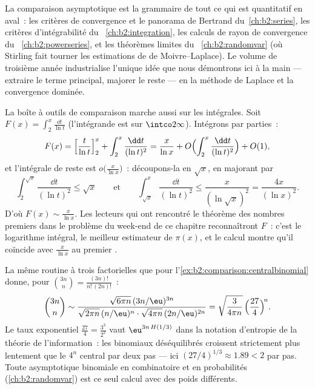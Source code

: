 \begin{remark}
La comparaison asymptotique est la grammaire de tout ce qui est
quantitatif en aval~: les critères de convergence et le panorama de
Bertrand du~\cref{ch:b2:series}, les critères d'intégrabilité du~%
\cref{ch:b2:integration}, les calculs de rayon de convergence du~%
\cref{ch:b2:powerseries}, et les théorèmes limites du~%
\cref{ch:b2:randomvar} (où Stirling fait tourner les estimations de de
Moivre--Laplace). Le volume de troisième année industrialise l'unique
idée que nous démontrons ici à la main --- extraire le terme
principal, majorer le reste --- en la méthode de Laplace et la
convergence dominée.
\end{remark}

\begin{example}\label{ex:b2:comparison:liworked}
La boîte à outils de comparaison marche aussi sur les intégrales. Soit
$F(x) = \int_2^x\frac{\dd t}{\ln t}$ (l'intégrande est  sur
$\intco2\infty$). Intégrons par parties~:
\[
F(x) = \Bigl[\frac{t}{\ln t}\Bigr]_2^x +
\int_2^x\frac{\dd t}{(\ln t)^2}
= \frac{x}{\ln x} + O\Bigl(\int_2^x\frac{\dd t}{(\ln
t)^2}\Bigr) + O(1),
\]
et l'intégrale de reste est $o\bigl(\frac{x}{\ln x}\bigr)$~:
découpons-la en $\sqrt x$, en majorant par
\[
\int_2^{\sqrt x}\frac{\dd t}{(\ln t)^2} \leq \sqrt x
\qquad\text{et}\qquad
\int_{\sqrt x}^{x}\frac{\dd t}{(\ln t)^2} \leq
\frac{x}{(\ln\sqrt x)^2} = \frac{4x}{(\ln x)^2} .
\]
D'où $F(x) \sim \frac{x}{\ln x}$. Les lecteurs qui ont rencontré le
théorème des nombres premiers dans le problème du week-end de ce
chapitre reconnaîtront $F$~: c'est le logarithme intégral, le meilleur
estimateur de $\pi(x)$, et le calcul montre qu'il coïncide avec
$\frac{x}{\ln x}$ au premier .
\end{example}

\begin{example}\label{ex:b2:comparison:lopsided}
La même routine à trois factorielles que pour
l'\cref{ex:b2:comparison:centralbinomial} donne, pour
$\binom{3n}{n} = \frac{(3n)!}{n!\,(2n)!}$~:
\[
\binom{3n}{n} \sim
\frac{\sqrt{6\pi n}\,(3n/\eu)^{3n}}
{\sqrt{2\pi n}\,(n/\eu)^{n}\cdot\sqrt{4\pi n}\,(2n/\eu)^{2n}}
= \sqrt{\frac{3}{4\pi n}}\,
\Bigl(\frac{27}{4}\Bigr)^{\!n} .
\]
Le taux exponentiel $\frac{27}4 = \frac{3^3}{2^2}$ vaut
$\eu^{3n\,H(1/3)}$ dans la notation d'entropie de la théorie de
l'information~: les binomiaux déséquilibrés croissent strictement plus
lentement que le $4^n$ central par deux pas --- ici $(27/4)^{1/3}
\approx 1.89 < 2$ par pas. Toute asymptotique binomiale en combinatoire
et en probabilités (\cref{ch:b2:randomvar}) est ce seul calcul avec
des poids différents.
\end{example}

